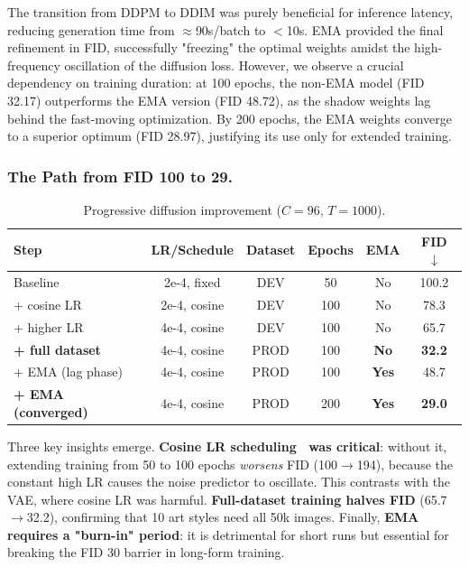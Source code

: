 \documentclass[runningheads]{llncs}
\begin{document}
The transition from DDPM to DDIM was purely beneficial for inference latency, reducing generation time from $\approx$90s/batch to $<$10s. EMA provided the final refinement in FID, successfully "freezing" the optimal weights amidst the high-frequency oscillation of the diffusion loss. However, we observe a crucial dependency on training duration: at 100 epochs, the non-EMA model (FID 32.17) outperforms the EMA version (FID 48.72), as the shadow weights lag behind the fast-moving optimization. By 200 epochs, the EMA weights converge to a superior optimum (FID 28.97), justifying its use only for extended training.

\subsubsection{The Path from FID 100 to 29.}

\begin{table}[htbp]
\caption{Progressive diffusion improvement ($C=96$, $T=1000$).}\label{tab:diff_path}
\centering\small
\begin{tabular}{lccccc}
\toprule
Step & LR/Schedule & Dataset & Epochs & EMA & FID $\downarrow$ \\
\midrule
Baseline & 2e-4, fixed & DEV & 50 & No & 100.2 \\
+ cosine LR & 2e-4, cosine & DEV & 100 & No & 78.3 \\
+ higher LR & 4e-4, cosine & DEV & 100 & No & 65.7 \\
\textbf{+ full dataset} & 4e-4, cosine & PROD & 100 & \textbf{No} & \textbf{32.2} \\
+ EMA (lag phase) & 4e-4, cosine & PROD & 100 & \textbf{Yes} & 48.7 \\
\textbf{+ EMA (converged)} & 4e-4, cosine & PROD & 200 & \textbf{Yes} & \textbf{29.0} \\
\bottomrule
\end{tabular}
\end{table}

Three key insights emerge. \textbf{Cosine LR scheduling~\cite{loshchilov2017} was critical}: without it, extending training from 50 to 100 epochs \emph{worsens} FID (100$\to$194), because the constant high LR causes the noise predictor to oscillate. This contrasts with the VAE, where cosine LR was harmful. \textbf{Full-dataset training halves FID} (65.7$\to$32.2), confirming that 10 art styles need all 50k images. Finally, \textbf{EMA requires a "burn-in" period}: it is detrimental for short runs but essential for breaking the FID 30 barrier in long-form training.
\end{document}
